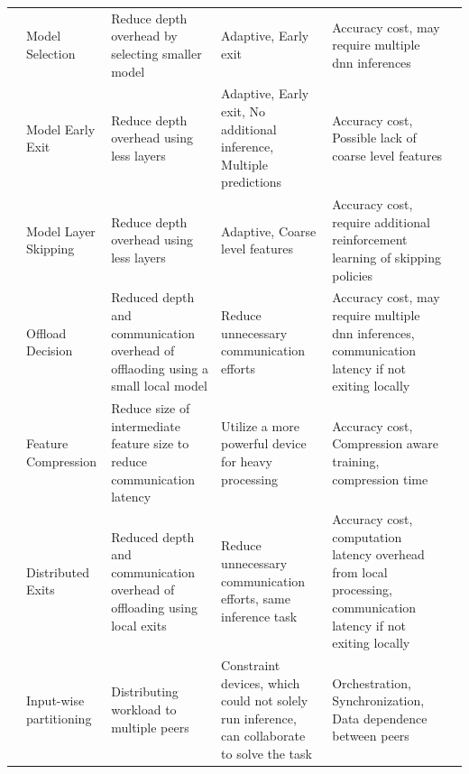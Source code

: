 \begin{minipage}[t]{\linewidth}
\begin{tiny}
\begin{longtabu}{>{\bfseries}X[0.8c]|X[c]|X[c]|X[c]|X[c]|X[c]}
	& Model Selection & Reduce depth overhead by selecting smaller model & Adaptive, Early exit & Accuracy cost, may require multiple \gls{dnn} inferences & \cite{bolukbasi_adaptive_2017, tann_flexible_2018} \tabularnewline
	
	& Model Early Exit & Reduce depth overhead using less layers & Adaptive, Early exit, No additional inference, Multiple predictions & Accuracy cost, Possible lack of coarse level features & \cite{leroux_resource-constrained_2015,teerapittayanon_branchynet:_2016, berestizshevsky_sacrificing_2019, kaya_shallow-deep_nodate, huang_multi-scale_2017} \tabularnewline
	& Model Layer Skipping & Reduce depth overhead using less layers & Adaptive, Coarse level features & Accuracy cost, require additional reinforcement learning of skipping policies & \cite{wang_skipnet:_2017,wu_blockdrop:_2017} \tabularnewline{}

	& Offload Decision & Reduced depth and communication overhead of offlaoding using a small local model & Reduce unnecessary communication efforts & Accuracy cost, may require multiple \gls{dnn} inferences, communication latency if not exiting locally & \cite{park_big/little_2015} \tabularnewline
	\hline
		
	 & Feature Compression & Reduce size of intermediate feature size to reduce communication latency & Utilize a more powerful device for heavy processing  & Accuracy cost, Compression aware training, compression time & \cite{kang_neurosurgeon:_2017,choi_near-lossless_2018, choi_deep_2018, eshratifar_bottlenet:_2019} \tabularnewline
	
	& Distributed Exits & Reduced depth and communication overhead of offloading using local exits  &  Reduce unnecessary communication efforts, same inference task & Accuracy cost, computation latency overhead from local processing, communication latency if not exiting locally & \cite{leroux_cascading_2017,teerapittayanon_distributed_2017, li_edge_2018} \tabularnewline\hline
	
	 & Input-wise partitioning & Distributing workload to multiple peers & Constraint devices, which could not solely run inference, can collaborate to solve the task & Orchestration, Synchronization, Data dependence between peers & \cite{mao_modnn:_2017, zhao_deepthings:_2018}
	\tabularnewline

	\bottomrule
\end{longtabu}
\end{tiny}
\end{minipage}

